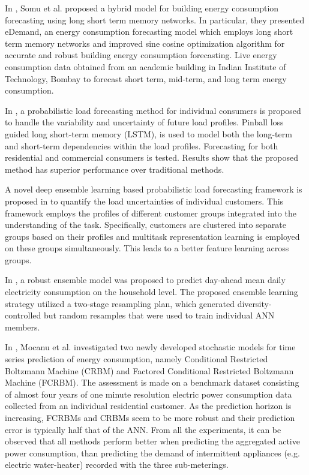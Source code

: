 In \cite{SOMU2020114131}, Somu et al. proposed a hybrid model for building energy consumption forecasting using long short term memory networks.
In particular, they presented eDemand, an energy consumption forecasting model which employs long short term memory networks and improved sine cosine optimization algorithm for accurate and robust building energy consumption forecasting.
Live energy consumption data obtained from an academic building in Indian Institute of Technology, Bombay to forecast short term, mid-term, and long term energy consumption.

In \cite{WANG201910}, a probabilistic load forecasting method for individual consumers is proposed to handle the variability and uncertainty of future load profiles.
Pinball loss guided long short-term memory (LSTM), is used to model both the long-term and short-term dependencies within the load profiles.
Forecasting for both residential and commercial consumers is tested.
Results show that the proposed method has superior performance over traditional methods.

A novel deep ensemble learning based probabilistic load forecasting framework is proposed in \cite{YANG2019116324} to quantify the load uncertainties of individual customers.
This framework employs the profiles of different customer groups integrated into the understanding of the task.
Specifically, customers are clustered into separate groups based on their profiles and multitask representation learning is employed on these groups simultaneously.
This leads to a better feature learning across groups.

In \cite{ALOBAIDI2018997}, a robust ensemble model was proposed to predict day-ahead mean daily electricity consumption on the household level.
The proposed ensemble learning strategy utilized a two-stage resampling plan, which generated diversity-controlled but random resamples that were used to train individual ANN members.

In \cite{MOCANU201691}, Mocanu et al. investigated two newly developed stochastic models for time series prediction of energy consumption, namely Conditional Restricted Boltzmann Machine (CRBM) and Factored Conditional Restricted Boltzmann Machine (FCRBM).
The assessment is made on a benchmark dataset consisting of almost four years of one minute resolution electric power consumption data collected from an individual residential customer.
As the prediction horizon is increasing, FCRBMs and CRBMs seem to be more robust and their prediction error is typically half that of the ANN.
From all the experiments, it can be observed that all methods perform better when predicting the aggregated active power consumption, than predicting the demand of intermittent appliances (e.g. electric water-heater) recorded with the three sub-meterings.

